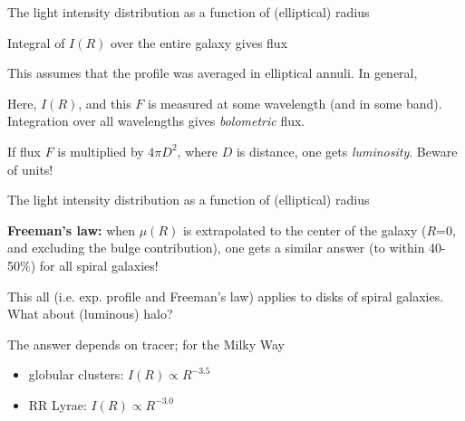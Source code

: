 \documentclass[letterpaper,landscape]{slides}
\begin{document}

\begin{slide}
\begin{center}
{\large \color{red} 
       The light intensity distribution as a function of (elliptical) radius  }
\end{center}


Integral of $I(R)$ over the entire galaxy gives flux

This assumes that the profile was averaged in elliptical annuli. 
In general,

Here, $I(R)$, and this $F$ is measured at some wavelength (and in 
some band). Integration over all wavelengths gives {\it bolometric}
flux. 

If flux $F$ is multiplied by $4 \pi D^2$, where $D$ is distance, 
one gets {\it luminosity}. Beware of units! 



\vfill
\end{slide}








\begin{slide}
\begin{center}
{\large \color{red} 
       The light intensity distribution as a function of (elliptical) radius  }
\end{center}

{\color{blue} \bf Freeman's law:} when $\mu(R)$ is extrapolated
to the center of the galaxy ($R$=0, and excluding the bulge contribution), 
one gets a similar answer (to within 40-50\%) for all spiral galaxies!


This all (i.e. exp. profile and Freeman's law) applies to disks
of spiral galaxies. What about (luminous) halo? 

The answer depends on tracer; for the Milky Way
\begin{itemize}
\item
  {\color{blue} globular clusters}: $I(R) \propto R^{-3.5}$
\item
  {\color{red} RR Lyrae}: $I(R) \propto R^{-3.0}$
\end{itemize}


\vfill
\end{slide}
\end{document}
